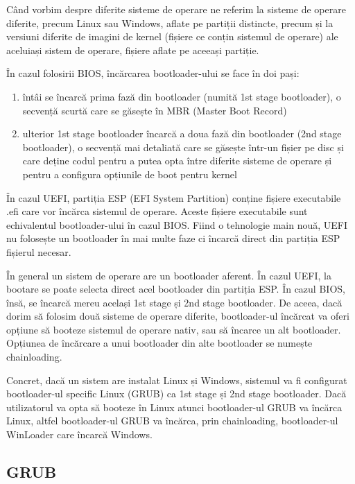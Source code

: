 Când vorbim despre diferite sisteme de operare ne referim la sisteme de operare
diferite, precum Linux sau Windows, aflate pe partiții distincte, precum și la
versiuni diferite de imagini de kernel (fișiere ce conțin sistemul de operare)
ale aceluiași sistem de operare, fișiere aflate pe aceeași partiție.

În cazul folosirii BIOS, încărcarea bootloader-ului se face în doi pași:

\begin{enumerate}
	\item întâi se încarcă prima fază din bootloader (numită 1st stage
		bootloader), o secvență scurtă care se găsește în MBR (Master
		Boot Record)
	\item ulterior 1st stage bootloader încarcă a doua fază din bootloader
		(2nd stage bootloader), o secvență mai detaliată care se găsește
		într-un fișier pe disc și care deține codul pentru a putea opta
		între diferite sisteme de operare și pentru a configura
		opțiunile de boot pentru kernel
\end{enumerate}

În cazul UEFI, partiția ESP (EFI System Partition) conține fișiere executabile
.efi care vor încărca sistemul de operare. Aceste fișiere executabile sunt
echivalentul bootloader-ului în cazul BIOS. Fiind o tehnologie main nouă, UEFI
nu folosește un bootloader în mai multe faze ci încarcă direct din partiția ESP
fișierul necesar.

În general un sistem de operare are un bootloader aferent. În cazul UEFI, la
bootare se poate selecta direct acel bootloader din partiția ESP. În cazul BIOS,
însă, se încarcă mereu același 1st stage și 2nd stage bootloader. De aceea, dacă
dorim să folosim două sisteme de operare diferite, bootloader-ul încărcat va
oferi opțiune să booteze sistemul de operare nativ, sau să încarce un alt
bootloader. Opțiunea de încărcare a unui bootloader din alte bootloader se
numește chainloading.

Concret, dacă un sistem are instalat Linux și Windows, sistemul va fi configurat
bootloader-ul specific Linux (GRUB) ca 1st stage și 2nd stage bootloader. Dacă
utilizatorul va opta să booteze în Linux atunci bootloader-ul GRUB va încărca
Linux, altfel bootloader-ul GRUB va încărca, prin chainloading, bootloader-ul
WinLoader care încarcă Windows.

\subsection{GRUB}
\label{sec:boot-bootloader-grub}

